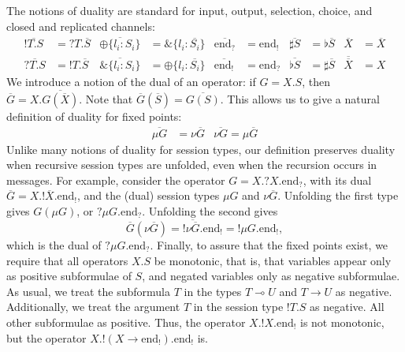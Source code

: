 \documentclass[orivec,envcountsame]{llncs}
\newcommand{\with}{\mathbin\binampersand}
\newcommand{\gvdual}[1]{\overline{#1}}
\newcommand{\gvout}[2]{{!#1.#2}}
\newcommand{\gvin}[2]{{?#1.#2}}
\newcommand{\lto}{\ensuremath{\multimap}}
\newcommand{\uto}{\ensuremath{\rightarrow}}
\newcommand{\outterm}{\mathrm{end}_!}
\newcommand{\interm}{\mathrm{end}_?}
\newcommand{\gvserver}[1]{\flat #1}
\newcommand{\gvservice}[1]{\sharp #1}
\begin{document}
The notions of duality are standard for input, output, selection, choice, and closed and replicated
channels:
{\small\begin{align*}
\gvdual{\gvout{T}{S}} &= \gvin{T}{\gvdual{S}} &
  \gvdual{\oplus \{ l_i: S_i \}} &= \with \{ l_i : \gvdual{S_i} \} &
  \gvdual{\interm} &= \outterm &
  \gvdual{\gvservice{S}} &= \gvserver{\gvdual{S}} &
  \gvdual{X} &= \gvdual{X} \\
\gvdual{\gvin{T}{S}} &= \gvout{T}{\gvdual{S}} &
  \gvdual{\with \{ l_i: S_i \}} &= \oplus \{ l_i : \gvdual{S_i} \} &
  \gvdual{\outterm} &= \interm &
  \gvdual{\gvserver{S}} &= \gvservice{\gvdual{S}} &
  \gvdual{\gvdual{X}} &= X
\end{align*}}
We introduce a notion of the dual of an operator: if $G = X.S$, then $\gvdual{G} =
X.\gvdual{G(\gvdual{X})}$.  Note that $\gvdual{G}(\gvdual{S}) = \gvdual{G(S)}$. This allows us to
give a natural definition of duality for fixed points:
%
{\small\begin{align*}
\gvdual{\mu G} &= \nu \gvdual{G} & \gvdual{\nu G} = \mu \gvdual{G}
\end{align*}}
Unlike many notions of duality for session types, our definition preserves duality when recursive
session types are unfolded, even when the recursion occurs in messages.  For example, consider the
operator $G = X.\gvin{X}{\interm}$, with its dual $\gvdual{G} = X.\gvout{\gvdual{X}}{\outterm}$, and
the (dual) session types $\mu G$ and $\nu \gvdual{G}$.  Unfolding the first type gives $G(\mu G)$, or
$\gvin{\mu G}{\interm}$.  Unfolding the second gives
{\small\[
\gvdual{G}(\nu \gvdual{G})
  = \gvout{\gvdual{\nu \gvdual{G}}}{\outterm}
  = \gvout{\mu G}{\outterm},
\]}
which is the dual of $\gvin{\mu G}{\interm}$.  Finally, to assure that the fixed points exist, we
require that all operators $X.S$ be monotonic, that is, that variables appear only as positive
subformulae of $S$, and negated variables only as negative subformulae.  As usual, we treat the
subformula $T$ in the types $T \lto U$ and $T \uto U$ as negative.  Additionally, we treat the
argument $T$ in the session type $\gvout{T}{S}$ as negative.  All other subformulae as positive.
Thus, the operator $X.\gvout{X}{\outterm}$ is not monotonic, but the operator $X.\gvout{(X \uto
  \outterm)}{\outterm}$ is.
\end{document}
